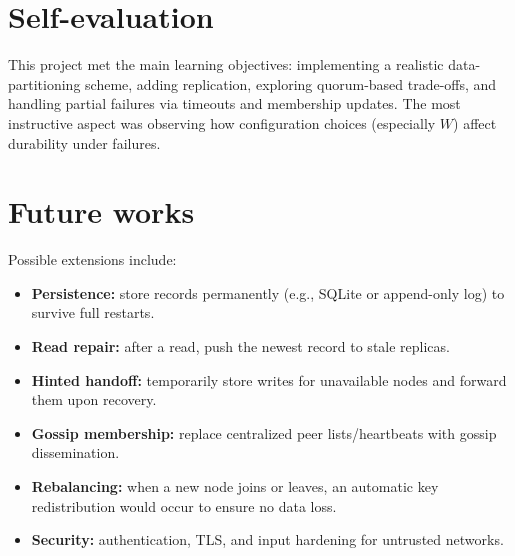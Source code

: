 \documentclass{scrartcl}
\begin{document}
\section{Self-evaluation}\label{self-evaluation}
This project met the main learning objectives: implementing a realistic data-partitioning scheme, adding replication, exploring quorum-based trade-offs, and handling partial failures via timeouts and membership updates. The most instructive aspect was observing how configuration choices (especially $W$) affect durability under failures.

\section{Future works}\label{future-works}
Possible extensions include:
\begin{itemize}
  \item \textbf{Persistence:} store records permanently (e.g., SQLite or append-only log) to survive full restarts.
  \item \textbf{Read repair:} after a read, push the newest record to stale replicas.
  \item \textbf{Hinted handoff:} temporarily store writes for unavailable nodes and forward them upon recovery.
  \item \textbf{Gossip membership:} replace centralized peer lists/heartbeats with gossip dissemination.
  \item \textbf{Rebalancing:} when a new node joins or leaves, an automatic key redistribution would occur to ensure no data loss.
  \item \textbf{Security:} authentication, TLS, and input hardening for untrusted networks.
\end{itemize}


\end{document}
